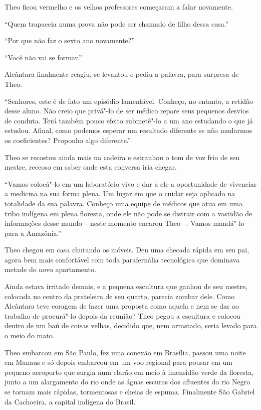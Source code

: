Theo ficou vermelho e os velhos professores começaram a falar novamente.

``Quem trapaceia numa prova não pode ser chamado de filho dessa casa.''

``Por que não faz o sexto ano novamente?''

``Você não vai se formar.''

Alcântara finalmente reagiu, se levantou e pediu a palavra, para
surpresa de Theo.

``Senhores, este é de fato um episódio lamentável. Conheço, no entanto,
a retidão desse aluno. Não creio que privá"-lo de ser médico repare seus
pequenos desvios de conduta. Terá também pouco efeito submetê"-lo a um
ano estudando o que já estudou. Afinal, como podemos esperar um
resultado diferente se não mudarmos os coeficientes? Proponho algo
diferente.''

Theo se recostou ainda mais na cadeira e estranhou o tom de voz frio de
seu mestre, receoso em saber onde esta conversa iria chegar.

``Vamos colocá"-lo em um laboratório vivo e dar a ele a oportunidade de
vivenciar a medicina na sua forma plena. Um lugar em que o cuidar seja
aplicado na totalidade da sua palavra. Conheço uma equipe de médicos que
atua em uma tribo indígena em plena floresta, onde ele não pode se
distrair com a vastidão de informações desse mundo -- neste momento
encarou Theo --. Vamos mandá"-lo para a Amazônia.''

\asterisc

Theo chegou em casa chutando os móveis. Deu uma checada rápida em seu
pai, agora bem mais confortável com toda parafernália tecnológica que
dominava metade do novo apartamento.

Ainda estava irritado demais, e a pequena escultura que ganhou de seu
mestre, colocada no centro da prateleira de seu quarto, parecia zombar
dele. Como Alcântara teve coragem de fazer uma proposta como aquela e
nem se dar ao trabalho de procurá"-lo depois da reunião? Theo pegou a escultura e
colocou dentro de um baú de coisas velhas, decidido que, nem arrastado,
seria levado para o meio do mato.

\asterisc

Theo embarcou em São Paulo, fez uma conexão em Brasília, passou uma
noite em Manaus e só depois embarcou em um voo regional para pousar em
um pequeno aeroporto que surgia num clarão em meio à imensidão verde da
floresta, junto a um alargamento do rio onde as águas escuras dos
afluentes do rio Negro se tornam mais rápidas, tormentosas e cheias de
espuma. Finalmente São Gabriel da Cachoeira, a capital indígena do
Brasil.

